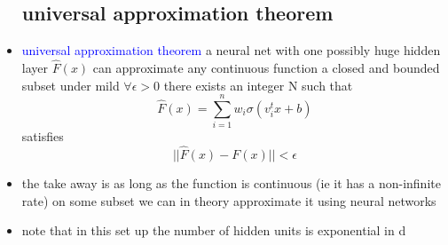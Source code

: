 \documentclass{article}
\begin{document}
\begin{itemize}
\subsection*{universal approximation theorem}
\item \textcolor{blue}{universal approximation theorem} a neural net with one possibly huge hidden layer $\hat{F}(x)$ can approximate any continuous function a closed and bounded subset under mild $\forall \epsilon>0 $ there exists an integer N such that $$\hat{F}(x)=\sum_{i=1}^{n}w_{i}\sigma(v_i^tx+b)$$ satisfies $$||\hat{F}(x)-F(x)||<\epsilon$$
\item the take away is as long as the function is continuous (ie it has a non-infinite rate) on some subset we can in theory approximate it using neural networks
\item note that in this set up the number of hidden units is exponential in d

\end{itemize}
\end{document}
